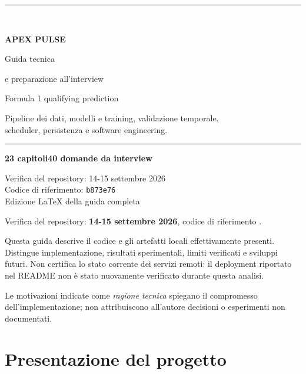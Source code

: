 \documentclass[11pt,a4paper]{article}
\newcommand{\code}[1]{{\ttfamily\small\seqsplit{#1}}}
\begin{document}
\begin{titlepage}
\thispagestyle{empty}
\sffamily
\vspace*{1.2cm}
{\color{accent}\rule{3cm}{2pt}}\\[1cm]
{\fontsize{40}{44}\selectfont\bfseries\color{ink}APEX PULSE\par}
\vspace{0.9cm}
{\fontsize{25}{31}\selectfont\color{ink}Guida tecnica\par}
{\fontsize{22}{29}\selectfont\color{ink}e preparazione all'interview\par}
\vspace{1.3cm}
{\large\color{ink!75}Formula 1 qualifying prediction\par}
\vspace{0.4cm}
{\normalsize Pipeline dei dati, modelli e training, validazione temporale,\\
 scheduler, persistenza e software engineering.\par}
\vfill
{\color{accent}\rule{\textwidth}{0.8pt}}
\vspace{0.4cm}
{\bfseries 23 capitoli\hspace{1.2cm}40 domande da interview\par}
\vspace{0.8cm}
{\small Verifica del repository: 14-15 settembre 2026\\
Codice di riferimento: \texttt{b873e76}\\
Edizione LaTeX della guida completa\par}
\vspace{1cm}
\end{titlepage}
\begingroup
\setlength{\parskip}{0pt}
\tableofcontents
\endgroup
\clearpage
{}
Verifica del repository: \textbf{14-15 settembre 2026}, codice di riferimento \textbf{\code{b873e76}}.

Questa guida descrive il codice e gli artefatti locali effettivamente presenti. Distingue implementazione, risultati sperimentali, limiti verificati e sviluppi futuri. Non certifica lo stato corrente dei servizi remoti: il deployment riportato nel README non è stato nuovamente verificato durante questa analisi.

Le motivazioni indicate come \emph{ragione tecnica} spiegano il compromesso dell'implementazione; non attribuiscono all'autore decisioni o esperimenti non documentati.

\section{Presentazione del progetto}\label{presentazione-del-progetto}
\end{document}
